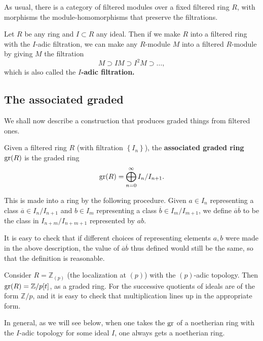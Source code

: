 As usual, there is a category of filtered modules over a fixed filtered ring
$R$, with morphisms the module-homomorphisms that preserve the filtrations.

\begin{example}
Let $R$ be any ring and $I \subset R$ any ideal. Then if we make $R$ into a
filtered ring with the $I$-adic filtration, we can make any $R$-module $M$
into a filtered $R$-module by giving $M$ the filtration
\[ M \supset IM \supset I^2M \supset \dots,  \]
which is also called the \textbf{$I$-adic filtration.}
\end{example} 





\subsection{The associated graded}

We shall now describe a construction that produces graded things from filtered
ones.

\begin{definition} Given a filtered ring $R$ (with filtration
$\left\{I_n\right\}$), the
\textbf{associated graded ring} $\operatorname{gr}(R)$ is the graded ring
$$\operatorname{gr}(R) = \bigoplus_{n=0}^\infty I_n /I_{n+1}.$$

This is made into a ring by the following procedure. Given $a \in I_n$
representing a class $\overline{a} \in I_n/I_{n+1}$ and $b \in I_m$
representing a class $\overline{b} \in I_m/I_{m+1}$, we define
$\overline{a}\overline{b} $ to be the class in $I_{n+m}/I_{n+m+1}$ represented
by $ab$. 
\end{definition}

It is easy to check that if different choices of representing elements $a,b$ were made in the above
description, the value of $\overline{a}\overline{b}$ thus defined would still
be the same, so that the definition is reasonable.

\begin{example} 
Consider $R = \mathbb{Z}_{(p)}$ (the localization at $(p)$) with the $(p)$-adic
topology. Then $\operatorname{gr}(R) = \mathbb{Z}/p[t]$, as a graded ring.
For the successive quotients of ideals are of the form $\mathbb{Z}/p$, and it
is easy to check that multiplication lines up in the appropriate form.
\end{example} 

In general, as we will see below, when one takes the $\operatorname{gr}$ of a noetherian ring
with the $I$-adic topology for some ideal $I$, one always gets a noetherian
ring.



